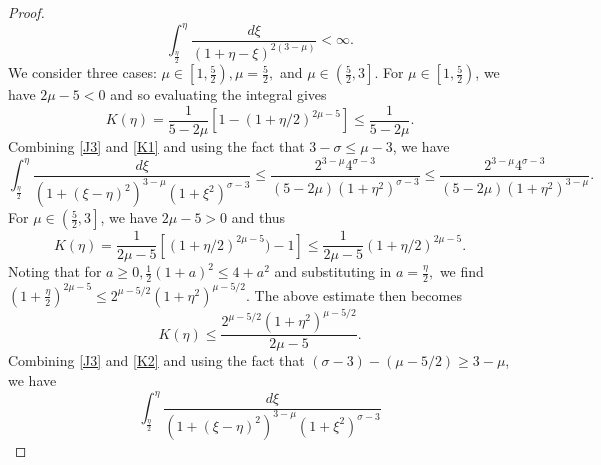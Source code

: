 \documentclass[reqno]{amsart}
\theoremstyle{plain}
\numberwithin{equation}{section}
\begin{document}
\begin{proof}
\begin{equation*}
         \int_{\frac{\eta}{2}}^{\eta}\frac{d\xi}{(1+\eta-\xi)^{2(3-\mu)}} < \infty.
\end{equation*}
We consider three cases: $\mu \in \left[1,\frac52\right), \mu = \frac52,$ and $\mu \in \left(\frac52, 3\right]$. 
For $\mu \in \left[1,\frac52\right)$, we have $2\mu-5 < 0$ and so evaluating the integral gives 
\begin{equation}\label{K1}
    K(\eta) = 
         \frac{1}{5-2\mu}\left[1-(1+\eta/2)^{2\mu-5}\right] 
         \leq \frac{1}{5-2\mu}.
\end{equation}
Combining \eqref{J3} and \eqref{K1} and using the fact that $3-\sigma \leq \mu - 3$, we have
\begin{equation}
    \int_{\frac{\eta}{2}}^{\eta}\frac{d \xi}{(1+(\xi - \eta)^2)^{3-\mu}(1 + \xi^2)^{\sigma-3}} 
        \leq \frac{2^{3-\mu}4^{\sigma-3}}{(5-2\mu)(1+\eta^2)^{\sigma-3}}
        \leq \frac{2^{3-\mu}4^{\sigma-3}}{(5-2\mu)(1+\eta^2)^{3-\mu}}.
\end{equation}
For $\mu \in \left(\frac52,3\right]$, we have $2\mu-5 > 0$ and thus
\begin{equation*}
    K(\eta) = 
         \frac{1}{2\mu-5}\left[(1+\eta/2)^{2\mu-5})-1\right] 
         \leq \frac{1}{2\mu-5}\left(1+\eta/2\right)^{2\mu-5}.
\end{equation*}
Noting that for $a \geq 0, \frac12(1+a)^2 \leq 4 + a^2$ and substituting in $a = \frac\eta2,$ we find 
    $(1 + \frac\eta2)^{2\mu-5} \leq 2^{\mu-5/2}(1 + \eta^2)^{\mu-5/2}.$ 
The above estimate then becomes
\begin{equation}\label{K2}
    K(\eta) \leq  
         \frac{2^{\mu-5/2}(1 + \eta^2)^{\mu-5/2}}{2\mu-5}.
\end{equation}
Combining \eqref{J3} and \eqref{K2} and using the fact that $(\sigma-3) - (\mu - 5/2) \geq 3 - \mu$, we have
\begin{equation}
    \int_{\frac{\eta}{2}}^{\eta}\frac{d \xi}{(1+(\xi - \eta)^2)^{3-\mu}(1 + \xi^2)^{\sigma-3}} 

\end{equation}
\end{proof}
\end{document}
